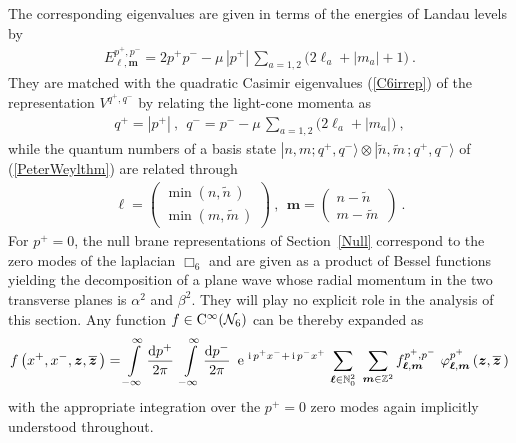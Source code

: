 \documentclass[11pt,a4paper]{article}
\newcommand{\ii}{{\rm i}}
\newcommand{\mbf}[1]{{\boldsymbol {#1} }}
\def\ii{{\,{\rm i}\,}}
\def\dd{{\rm d}}
\def\mz{{\mbf z}}
\def\mm{{\mbf m}}
\def\mell{{\mbf\ell}}
\newcommand{\zed}{{\mathbb Z}} %
\newcommand{\nat}{{\mathbb N}} %
\def\e{{\,\rm e}\,}
\newcommand{\beq}{\begin{eqnarray}}
\newcommand{\eeq}{\end{eqnarray}}
\begin{document}
The corresponding eigenvalues are given in terms of the energies of
Landau levels by
\beq
E_{\mell,\mm}^{p^+,p^-}=2p^+p^--\mu\,\left|p^+\right|\,
\sum_{a=1,2}\bigl(2\ell_a+|m_a|+1\bigr) \ .
\label{Landaulevels}\eeq
They are matched with the quadratic Casimir eigenvalues
(\ref{C6irrep}) of the representation $V^{q^+,q^-}$ by relating the
light-cone momenta as
\beq
q^+=\left|p^+\right| \ , ~~ q^-=p^--\mu\,\sum_{a=1,2}\bigl(2\ell_a+
|m_a|\bigr) \ ,
\label{momid}\eeq
while the quantum numbers of a basis state
$|n,m;q^+,q^-\rangle\otimes|\widetilde{n},\widetilde{m}\,;q^+,q^-\rangle$
of (\ref{PeterWeylthm}) are related through
\beq
\mell=\begin{pmatrix}\min\left(n,\widetilde{n}\,\right)\\
\min\left(m,\widetilde{m}\,\right)\end{pmatrix} \ , ~~
\mm=\begin{pmatrix}n-\widetilde{n}\,\\m-\widetilde{m}\,
\end{pmatrix} \ .
\label{quantnumid}\eeq
For $p^+=0$, the null brane representations of
Section~\ref{Null} correspond to the zero modes of the laplacian
$\Box_6$ and are given as a product of Bessel functions yielding the
decomposition of a plane wave whose radial momentum in the two
transverse planes is $\alpha^2$ and $\beta^2$. They will play no
explicit role in the analysis of this section. Any function $f\in{\rm
  C}^\infty(\mathcal{N}_6)$ can be thereby expanded as
\beq
f\left(x^+,x^-,\mz,\overline{\mz}\,\right)=\int\limits_{-\infty}^\infty
\frac{\dd p^+}{2\pi}~\int\limits_{-\infty}^\infty
\frac{\dd p^-}{2\pi}~\e^{\ii p^+x^-+\ii
  p^-x^+}\,\sum_{\mell\in\nat_0^2}~\sum_{\mm\in\zed^2}f_{\mell,\mm}^{p^+,p^-}~
\varphi^{p^+}_{\mell,\mm}\left(\mz,\overline{\mz}\,\right)
\label{fNW6exp}\eeq
with the appropriate integration over the $p^+=0$ zero modes again
implicitly understood throughout.
\end{document}
